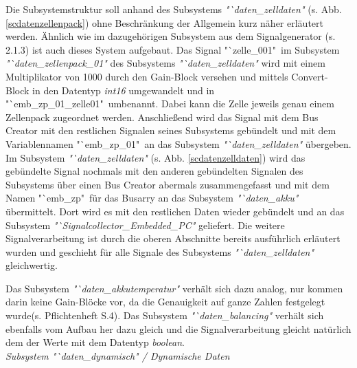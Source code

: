 \documentclass[fontsize = 12pt, paper = a4]{scrreprt}
\begin{document}
Die Subsystemstruktur soll anhand des Subsystems \textit{"`daten\_zelldaten"} (s. Abb. \ref{scdatenzellenpack}) ohne Beschränkung der Allgemein kurz näher erläutert werden. Ähnlich wie im dazugehörigen Subsystem aus dem Signalgenerator (s. 2.1.3) ist auch dieses System aufgebaut. Das Signal "`zelle\_001"\ im Subsystem \textit{"`daten\_zellenpack\_01"} des Subsystems \textit{"`daten\_zelldaten"} wird mit einem Multiplikator von 1000 durch den Gain-Block versehen und mittels Convert-Block in den Datentyp \textit{int16} umgewandelt und in "`emb\_zp\_01\_zelle01"\ umbenannt. Dabei kann die Zelle jeweils genau einem Zellenpack zugeordnet werden. Anschließend wird das Signal mit dem Bus Creator mit den restlichen Signalen seines Subsystems gebündelt und mit dem Variablennamen "`emb\_zp\_01"\ an das Subsystem \textit{"`daten\_zelldaten"} übergeben. Im Subsystem \textit{"`daten\_zelldaten"} (s. Abb. \ref{scdatenzelldaten}) wird das gebündelte Signal nochmals mit den anderen gebündelten Signalen des Subsystems über einen Bus Creator abermals zusammengefasst und mit dem Namen "`emb\_zp"\ für das Busarry an das Subsystem \textit{"`daten\_akku"} übermittelt. Dort wird es mit den restlichen Daten wieder gebündelt und an das Subsystem \textit{"`Signalcollector\_Embedded\_PC"} geliefert. Die weitere Signalverarbeitung ist durch die oberen Abschnitte bereits ausführlich erläutert wurden und geschieht für alle Signale des Subsystems \textit{"`daten\_zelldaten"} gleichwertig.

\newpage

Das Subsystem \textit{"`daten\_akkutemperatur"} verhält sich dazu analog, nur kommen darin keine Gain-Blöcke vor, da die Genauigkeit auf ganze Zahlen festgelegt wurde(s. Pflichtenheft S.4).
Das Subsystem \textit{"`daten\_balancing"} verhält sich ebenfalls vom Aufbau her dazu gleich und die Signalverarbeitung gleicht natürlich dem der Werte mit dem Datentyp \textit{boolean}. \\


\textit{Subsystem "`daten\_dynamisch" / Dynamische Daten} \\
\end{document}

